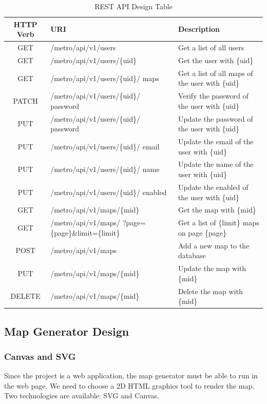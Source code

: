 \begin{table}[!htb]
  \centering
  \begin{tabularx}{\textwidth}{>{\raggedright}cXX}
    \toprule[1.5pt]
    \textbf{HTTP Verb} & \textbf{URI} & \textbf{Description}
    \\ \midrule[1.5pt]
    GET & /metro/api/v1/users & Get a list of all users
    \\ \midrule
    GET & /metro/api/v1/users/\{uid\} & Get the user with \{uid\}
    \\ \midrule
    GET & /metro/api/v1/users/\{uid\}/ maps & Get a list of all maps of the user with \{uid\}
    \\ \midrule
    PATCH & /metro/api/v1/users/\{uid\}/ password & Verify the password of the user with \{uid\}
    \\ \midrule
    PUT & /metro/api/v1/users/\{uid\}/ password & Update the password of the user with \{uid\}
    \\ \midrule
    PUT & /metro/api/v1/users/\{uid\}/ email & Update the email of the user with \{uid\} \\ \midrule
    PUT & /metro/api/v1/users/\{uid\}/ name & Update the name of the user with \{uid\} \\ \midrule
    PUT & /metro/api/v1/users/\{uid\}/ enabled & Update the enabled of the user with \{uid\}
    \\ \midrule
    GET & /metro/api/v1/maps/\{mid\} & Get the map with \{mid\}
    \\ \midrule
    GET & /metro/api/v1/maps/ ?page=\{page\}\&limit=\{limit\} & Get a list of \{limit\} maps on page \{page\}
    \\ \midrule
    POST & /metro/api/v1/maps & Add a new map to the database
    \\ \midrule
    PUT & /metro/api/v1/maps/\{mid\} & Update the map with \{mid\}
    \\ \midrule
    DELETE & /metro/api/v1/maps/\{mid\} & Delete the map with \{mid\}
    \\ \bottomrule[1.5pt]
  \end{tabularx}
  \caption[REST API Design Table]{REST API Design Table}
  \label{tab:REST API Design Table}
\end{table}

\subsection{Map Generator Design}
\label{sec:Design>Map Generator Design}
\subsubsection{Canvas and SVG}
\label{sec:Design>Map Generator Design>Canvas and SVG}
Since the project is a web application, the map generator must be able to run in the web page. We need to choose a 2D HTML graphics tool to render the map. Two technologies are available: SVG and Canvas.

